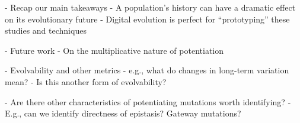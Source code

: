 - Recap our main takeaways
    - A population's history can have a dramatic effect on its evolutionary future
    - Digital evolution is perfect for ``prototyping'' these studies and techniques

- Future work
    - On the multiplicative nature of potentiation

    - Evolvability and other metrics
        - e.g., what do changes in long-term variation mean? 
            - Is this another form of evolvability? 
            
    - Are there other characteristics of potentiating mutations worth identifying?
        - E.g., can we identify directness of epistasis? Gateway mutations?